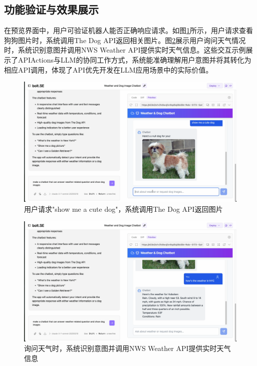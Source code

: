 \subsection{功能验证与效果展示}

在预览界面中，用户可验证机器人能否正确响应请求。如图\ref{fig:demo_dog}所示，用户请求查看狗狗图片时，系统调用The Dog API返回相关图片。图\ref{fig:demo_weather}展示用户询问天气情况时，系统识别意图并调用NWS Weather API提供实时天气信息。这些交互示例展示了APIActions与LLM的协同工作方式，系统能准确理解用户意图并将其转化为相应API调用，体现了API优先开发在LLM应用场景中的实际价值。

\begin{figure}[H]
  \centering
  \includegraphics[width=\textwidth]{figures/screenshots/api-actions/demo_dog_preview.png}
  \caption{用户请求"show me a cute dog"，系统调用The Dog API返回图片}
  \label{fig:demo_dog}
\end{figure}

\begin{figure}[H]
  \centering
  \includegraphics[width=\textwidth]{figures/screenshots/api-actions/demo_weather_preview.png}
  \caption{询问天气时，系统识别意图并调用NWS Weather API提供实时天气信息}
  \label{fig:demo_weather}
\end{figure}